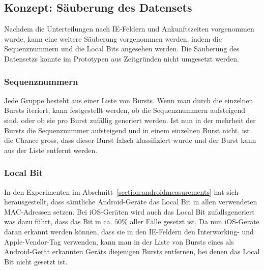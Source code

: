 \subsection{Konzept: Säuberung des Datensets}
Nachdem die Unterteilungen nach IE-Feldern und Ankunftszeiten vorgenommen wurde, 
kann eine weitere Säuberung vorgenommen werden, indem die Sequenznummern und die 
Local Bits angesehen werden. Die Säuberung des Datensetzs konnte im Prototypen 
aus Zeitgründen nicht umgesetzt werden.

\subsubsection*{Sequenznummern}
Jede Gruppe besteht aus einer Liste von Bursts. Wenn man durch die einzelnen Bursts
iteriert, kann festgestellt werden, ob die Sequenznummern aufsteigend sind, oder ob 
sie pro Burst zufällig generiert werden. Ist nun in der mehrheit der Bursts die 
Sequenznummer aufsteigend und in einem einzelnen Burst nicht, ist die Chance gross,
dass dieser Burst falsch klassifiziert wurde und der Burst kann aus der Liste entfernt
werden. 

\subsubsection*{Local Bit}
In den Experimenten im Abschnitt~\ref{section:androidmeasurements} hat sich herausgestellt,
dass sämtliche Android-Geräte das Local Bit in allen verwendeten MAC-Adressen setzen.
Bei iOS-Geräten wird auch das Local Bit zufallsgeneriert was dazu führt, dass das Bit 
in ca. $50\%$ aller Fälle gesetzt ist.
Da nun iOS-Geräte daran erkannt werden können, dass sie in den IE-Feldern den 
Interworking- und Apple-Vendor-Tag verwenden, kann man in der Liste von Bursts eines 
als Android-Gerät erkannten Geräts diejenigen Bursts entfernen, bei denen das Local Bit 
nicht gesetzt ist.

\clearpage